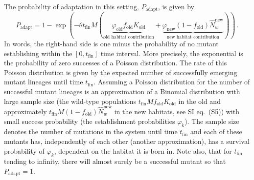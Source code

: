 \documentclass[11pt]{article}
\newcommand{\pete}[1]{\textcolor{orange}{(#1)}}
\newcommand{\chg}[1]{\textcolor{change}{#1}}
\begin{document}
The probability of adaptation in this setting, $P_{\mathrm{adapt}}$, is given by
\begin{equation}\label{eq:source_sink}
	P_{\mathrm{adapt}} = 1 - \exp\left(-\theta t_{\text{fin}} M \left(\underbrace{\varphi_{\text{old}} f_{\text{old}} K_{\text{old}}}_{\text{old habitat contribution}} + \underbrace{\varphi_{\text{new}} (1-f_{\text{old}}) \widehat{N}_w^{\text{new}}}_{\text{new habitat contribution}}\right)\right)\, .	
\end{equation}
In words, the right-hand side is one minus the probability of no mutant establishing within the $[0, t_{\text{fin}}]$ time interval.
More precisely, the exponential is the probability of zero successes of a Poisson distribution. The rate of this Poisson distribution is given by the expected number of successfully emerging mutant lineages until time $t_{\text{fin}}$. \chg{Assuming a Poisson distribution for the number of successful mutant lineages is an approximation of a Binomial distribution with large sample size (the wild-type populations $t_{\text{fin}} M f_{\text{old}} K_{\text{old}}$ in the old and approximately $t_{\text{fin}} M (1-f_{\text{old}}) \widehat{N}_w^{\text{new}}$ in the new habitats, see SI eq.~(S5)) with small success probability (the establishment probabilities $\varphi_{k}$). The sample size denotes the number of mutations in the system until time $t_{\text{fin}}$ and each of these mutants has, independently of each other (another approximation), has a survival probability of $\varphi_{k}$, dependent on the habitat it is born in.}
Note also, that for $t_{\text{fin}}$ tending to infinity, there will almost surely be a successful mutant so that $P_{\text{adapt}}=1$. \\
\end{document}
